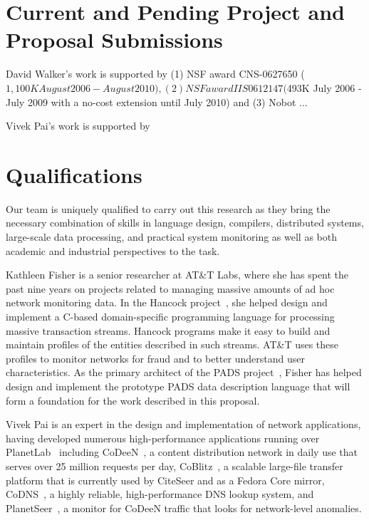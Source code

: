 \documentclass[12pt]{article}
\begin{document}
\section{Current and Pending Project and Proposal Submissions}

David Walker's work is supported by (1) NSF award CNS-0627650 ($1,100K
August 2006 - August 2010), (2) NSF award IIS 0612147 
($493K July 2006 - July 2009 with a no-cost extension until July 2010)
and (3) Nobot ...

Vivek Pai's work is supported by

\section{Qualifications}

Our team is uniquely qualified to carry out this research as they
bring the necessary combination of skills in language design,
compilers, distributed systems, large-scale data processing, and
practical system monitoring as well as both academic and industrial
perspectives to the task.  

Kathleen Fisher is a senior researcher at AT\&T Labs,
where she has spent the past nine years on projects
related to managing massive amounts of ad hoc network monitoring data.
In the Hancock project~\cite{kdd00,hancock-toplas}, she helped 
design and implement a C-based
domain-specific programming language for processing massive  
transaction streams.  Hancock programs make it easy to build
and maintain profiles of the entities described in such streams. 
AT\&T uses these profiles to monitor networks for fraud 
and to better understand user characteristics.
As the primary architect of the PADS project~\cite{fisher+:pads}, 
Fisher has helped design and implement the prototype PADS
data description language that will form a foundation for the work
described in this proposal.  

Vivek Pai is an expert in the
design and implementation of network applications, having developed
numerous high-performance applications running over
PlanetLab~\cite{planetlab} including CoDeeN~\cite{codeen}, a content
distribution network in daily use that serves over 25 million
requests per day, CoBlitz~\cite{coblitz}, a scalable large-file
transfer platform that is currently used by CiteSeer and as
a Fedora Core mirror, CoDNS~\cite{codns}, a highly reliable,
high-performance DNS lookup system, and PlanetSeer~\cite{planetseer},
a monitor for CoDeeN traffic that looks for network-level anomalies.
\end{document}
